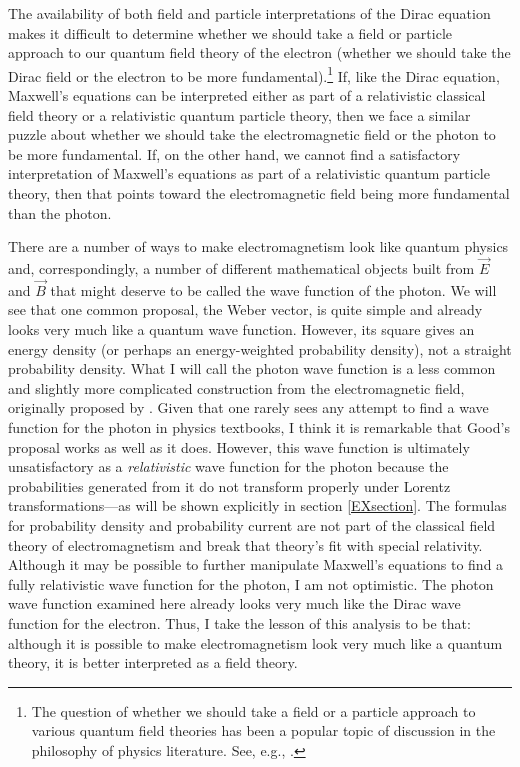 \documentclass[12pt,secnumarabic,amsmath,amssymb,balancelastpage,nofootinbib]{article}
\begin{document}
The availability of both field and particle interpretations of the Dirac equation makes it difficult to determine whether we should take a field or particle approach to our quantum field theory of the electron (whether we should take the Dirac field or the electron to be more fundamental).\footnote{The question of whether we should take a field or a particle approach to various quantum field theories has been a popular topic of discussion in the philosophy of physics literature.  See, e.g., \citet{malament1996, halvorsonclifton2002, fraser2008, baker2009, baker2016, struyve2011, wallace2017}.}  If, like the Dirac equation, Maxwell's equations can be interpreted either as part of a relativistic classical field theory or a relativistic quantum particle theory, then we face a similar puzzle about whether we should take the electromagnetic field or the photon to be more fundamental.  If, on the other hand, we cannot find a satisfactory interpretation of Maxwell's equations as part of a relativistic quantum particle theory, then that points toward the electromagnetic field being more fundamental than the photon.

There are a number of ways to make electromagnetism look like quantum physics and, correspondingly, a number of different mathematical objects built from $\vec{E}$ and $\vec{B}$ that might deserve to be called the wave function of the photon.  We will see that one common proposal, the Weber vector, is quite simple and already looks very much like a quantum wave function.  However, its square gives an energy density (or perhaps an energy-weighted probability density), not a straight probability density.  What I will call the photon wave function is a less common and slightly more complicated construction from the electromagnetic field, originally proposed by \citet{good1957}.  Given that one rarely sees any attempt to find a wave function for the photon in physics textbooks, I think it is remarkable that Good's proposal works as well as it does.  However, this wave function is ultimately unsatisfactory as a \emph{relativistic} wave function for the photon because the probabilities generated from it do not transform properly under Lorentz transformations---as will be shown explicitly in section \ref{EXsection}.  The formulas for probability density and probability current are not part of the classical field theory of electromagnetism and break that theory's fit with special relativity.  Although it may be possible to further manipulate Maxwell's equations to find a fully relativistic wave function for the photon, I am not optimistic.  The photon wave function examined here already looks very much like the Dirac wave function for the electron.  Thus, I take the lesson of this analysis to be that: although it is possible to make electromagnetism look very much like a quantum theory, it is better interpreted as a field theory.
\end{document}
